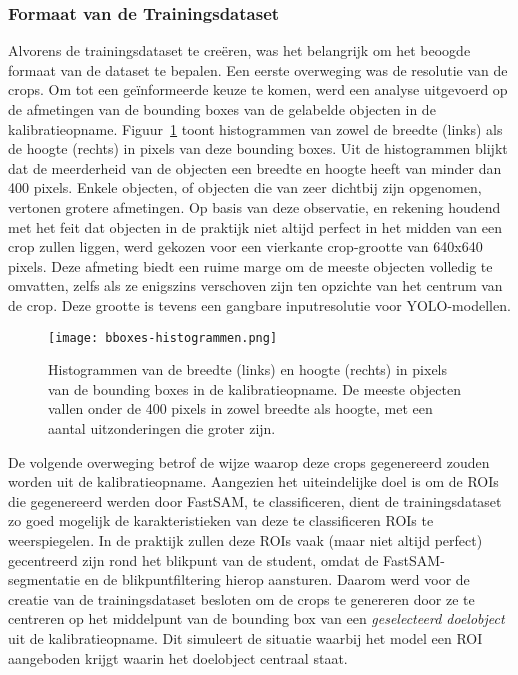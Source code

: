 \subsubsection{Formaat van de Trainingsdataset}

Alvorens de trainingsdataset te creëren, was het belangrijk om het beoogde formaat van de dataset te bepalen.
Een eerste overweging was de resolutie van de crops. 
Om tot een geïnformeerde keuze te komen, werd een analyse uitgevoerd op de afmetingen van de bounding boxes 
van de gelabelde objecten in de kalibratieopname. 
Figuur~\ref{fig:size-histogram} toont histogrammen van zowel de breedte (links) als de hoogte (rechts) 
in pixels van deze bounding boxes. 
Uit de histogrammen blijkt dat de meerderheid van de objecten een breedte en hoogte heeft van minder dan 400 pixels. 
Enkele objecten, of objecten die van zeer dichtbij zijn opgenomen, vertonen grotere afmetingen. 
Op basis van deze observatie, en rekening houdend met het feit dat objecten in de praktijk 
niet altijd perfect in het midden van een crop zullen liggen, 
werd gekozen voor een vierkante crop-grootte van 640x640 pixels. 
Deze afmeting biedt een ruime marge om de meeste objecten volledig te omvatten, zelfs als ze enigszins 
verschoven zijn ten opzichte van het centrum van de crop. 
Deze grootte is tevens een gangbare inputresolutie voor YOLO-modellen.

\begin{figure}[H]
    \centering
    \texttt{[image: bboxes-histogrammen.png]}
    \caption[Histogrammen van de breedte en grootte in pixels van bounding boxes in de kalibratieopname]{
      \label{fig:size-histogram}
      Histogrammen van de breedte (links) en hoogte (rechts) in pixels van de bounding boxes in de kalibratieopname.
      De meeste objecten vallen onder de 400 pixels in zowel breedte als hoogte, met een aantal uitzonderingen die groter zijn.
    }
\end{figure}

De volgende overweging betrof de wijze waarop deze crops gegenereerd zouden worden uit de kalibratieopname. 
Aangezien het uiteindelijke doel is om de ROIs die gegenereerd werden door FastSAM, te classificeren, 
dient de trainingsdataset zo goed mogelijk de karakteristieken van deze te classificeren ROIs te weerspiegelen. 
In de praktijk zullen deze ROIs vaak (maar niet altijd perfect) gecentreerd zijn rond het blikpunt van de student, 
omdat de FastSAM-segmentatie en de blikpuntfiltering hierop aansturen. 
Daarom werd voor de creatie van de trainingsdataset besloten om de crops te genereren 
door ze te centreren op het middelpunt van de bounding box van een \textit{geselecteerd doelobject} uit de kalibratieopname. 
Dit simuleert de situatie waarbij het model een ROI aangeboden krijgt waarin het doelobject centraal staat.

